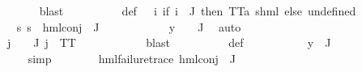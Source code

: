 \begin{isabellebody}
\ \ \ \ \ \ \ \ \ \ \isamarkupfalse%
\ blast\isanewline
\ \ \ \ \ \ \isamarkupfalse%
\ {\isasymPsi}\ \ {\isasymPsi}{\isacharunderscore}{\kern0pt}def{\isacharcolon}{\kern0pt}\ {\isachardoublequoteopen}{\isasymPsi}\ {\isacharequal}{\kern0pt}\ {\isacharparenleft}{\kern0pt}{\isasymlambda}i{\isachardot}{\kern0pt}\ {\isacharparenleft}{\kern0pt}if\ i\ {\isasymin}\ J\ then\ {\isacharparenleft}{\kern0pt}TT{\isacharcolon}{\kern0pt}{\isacharcolon}{\kern0pt}{\isacharparenleft}{\kern0pt}{\isacharprime}{\kern0pt}a{\isacharcomma}{\kern0pt}\ {\isacharprime}{\kern0pt}s{\isacharparenright}{\kern0pt}hml{\isacharparenright}{\kern0pt}\ else\ undefined{\isacharparenright}{\kern0pt}{\isacharparenright}{\kern0pt}{\isachardoublequoteclose}\isanewline
\ \ \ \ \ \ \isamarkupfalse%
\ {\isachardoublequoteopen}{\isasymforall}s{\isachardot}{\kern0pt}\ {\isasymnot}s\ {\isasymTurnstile}\ {\isacharparenleft}{\kern0pt}hml{\isacharunderscore}{\kern0pt}conj\ {\isacharbraceleft}{\kern0pt}{\isacharbraceright}{\kern0pt}\ J\ {\isasymPsi}{\isacharparenright}{\kern0pt}{\isachardoublequoteclose}\ \isanewline
\ \ \ \ \ \ \ \ \isamarkupfalse%
\ {\isacartoucheopen}y\ {\isasymin}\ {\isasymPhi}\ {\isacharbackquote}{\kern0pt}\ J{\isacartoucheclose}\ \isamarkupfalse%
\ auto\isanewline
\ \ \ \ \ \ \isamarkupfalse%
\ {\isachardoublequoteopen}{\isasymPsi}\ {\isacharbackquote}{\kern0pt}\ {\isacharbraceleft}{\kern0pt}{\isacharbraceright}{\kern0pt}\ {\isacharequal}{\kern0pt}\ {\isacharbraceleft}{\kern0pt}{\isacharbraceright}{\kern0pt}{\isachardoublequoteclose}\ {\isachardoublequoteopen}{\isasymforall}j\ {\isasymin}\ {\isasymPsi}\ {\isacharbackquote}{\kern0pt}\ J{\isachardot}{\kern0pt}\ j\ {\isacharequal}{\kern0pt}\ TT{\isachardoublequoteclose}\ \isanewline
\ \ \ \ \ \ \ \ \ \isamarkupfalse%
\ blast\isanewline
\ \ \ \ \ \ \ \ \isamarkupfalse%
\ {\isasymPsi}{\isacharunderscore}{\kern0pt}def\ \isanewline
\ \ \ \ \ \ \ \ \isamarkupfalse%
\ {\isacartoucheopen}y\ {\isasymin}\ {\isasymPhi}{\isacharbackquote}{\kern0pt}J{\isacartoucheclose}\ \isanewline
\ \ \ \ \ \ \ \ \isamarkupfalse%
\ simp\isanewline
\ \ \ \ \ \ \isamarkupfalse%
\ {\isachardoublequoteopen}hml{\isacharunderscore}{\kern0pt}failure{\isacharunderscore}{\kern0pt}trace\ {\isacharparenleft}{\kern0pt}hml{\isacharunderscore}{\kern0pt}conj\ {\isacharbraceleft}{\kern0pt}{\isacharbraceright}{\kern0pt}\ J\ {\isasymPsi}{\isacharparenright}{\kern0pt}{\isachardoublequoteclose}\ \isanewline

\end{isabellebody}
